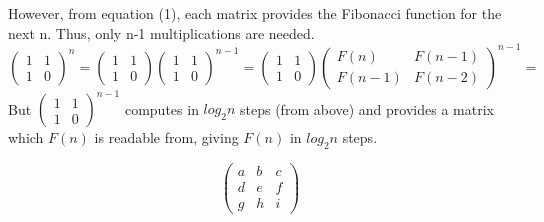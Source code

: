 \documentclass[11pt, a4paper]{article}
\begin{document}
{However, from equation (1), each matrix provides the Fibonacci function for the next n. Thus,
only n-1 multiplications are needed.
        \[\begin{pmatrix}
          1 & 1 \\
          1 & 0
        \end{pmatrix} ^n =
         \begin{pmatrix}
          1 & 1 \\
          1 & 0
        \end{pmatrix}
        \begin{pmatrix}
          1 & 1 \\
          1 & 0
      \end{pmatrix}^{n-1} =
          \begin{pmatrix}
          1 & 1 \\
          1 & 0
        \end{pmatrix}
        \begin{pmatrix}
          F(n) & F(n-1) \\
          F(n-1) & F(n-2)
      \end{pmatrix}^{n-1} =   
    \]
But $\begin{pmatrix}
          1 & 1 \\
          1 & 0
      \end{pmatrix}^{n-1}$ 
      computes in $log_2 n$ steps (from above) and provides a matrix which $F(n)$ is readable from, giving $F(n)$ in $log_2 n$ steps.

\[ \left( \begin{array}{ccc}
a & b & c \\
d & e & f \\
g & h & i \end{array} \right)\] 


}
\end{document}
